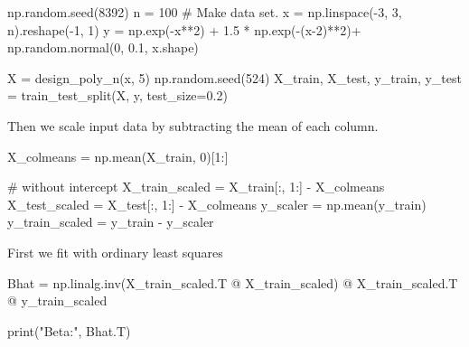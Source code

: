 \documentclass[
  letterpaper,
  DIV=11,
  numbers=noendperiod]{scrartcl}
\newenvironment{Shaded}{\begin{snugshade}}{\end{snugshade}}
\newcommand{\BuiltInTok}[1]{\textcolor[rgb]{0.00,0.23,0.31}{#1}}
\newcommand{\CommentTok}[1]{\textcolor[rgb]{0.37,0.37,0.37}{#1}}
\newcommand{\DecValTok}[1]{\textcolor[rgb]{0.68,0.00,0.00}{#1}}
\newcommand{\FloatTok}[1]{\textcolor[rgb]{0.68,0.00,0.00}{#1}}
\newcommand{\NormalTok}[1]{\textcolor[rgb]{0.00,0.23,0.31}{#1}}
\newcommand{\OperatorTok}[1]{\textcolor[rgb]{0.37,0.37,0.37}{#1}}
\newcommand{\StringTok}[1]{\textcolor[rgb]{0.13,0.47,0.30}{#1}}
\begin{document}
\begin{Shaded}
\begin{Highlighting}[]
\NormalTok{np.random.seed(}\DecValTok{8392}\NormalTok{)}
\NormalTok{n }\OperatorTok{=} \DecValTok{100}
\CommentTok{\# Make data set.}
\NormalTok{x }\OperatorTok{=}\NormalTok{ np.linspace(}\OperatorTok{{-}}\DecValTok{3}\NormalTok{, }\DecValTok{3}\NormalTok{, n).reshape(}\OperatorTok{{-}}\DecValTok{1}\NormalTok{, }\DecValTok{1}\NormalTok{)}
\NormalTok{y }\OperatorTok{=}\NormalTok{ np.exp(}\OperatorTok{{-}}\NormalTok{x}\OperatorTok{**}\DecValTok{2}\NormalTok{) }\OperatorTok{+} \FloatTok{1.5} \OperatorTok{*}\NormalTok{ np.exp(}\OperatorTok{{-}}\NormalTok{(x}\OperatorTok{{-}}\DecValTok{2}\NormalTok{)}\OperatorTok{**}\DecValTok{2}\NormalTok{)}\OperatorTok{+}\NormalTok{ np.random.normal(}\DecValTok{0}\NormalTok{, }\FloatTok{0.1}\NormalTok{, x.shape)}

\NormalTok{X }\OperatorTok{=}\NormalTok{ design\_poly\_n(x, }\DecValTok{5}\NormalTok{)}
\NormalTok{np.random.seed(}\DecValTok{524}\NormalTok{)}
\NormalTok{X\_train, X\_test, y\_train, y\_test }\OperatorTok{=}\NormalTok{ train\_test\_split(X, y, test\_size}\OperatorTok{=}\FloatTok{0.2}\NormalTok{)}
\end{Highlighting}
\end{Shaded}

Then we scale input data by subtracting the mean of each column.

\begin{Shaded}
\begin{Highlighting}[]
\NormalTok{X\_colmeans }\OperatorTok{=}\NormalTok{ np.mean(X\_train, }\DecValTok{0}\NormalTok{)[}\DecValTok{1}\NormalTok{:]}

\CommentTok{\# without intercept}
\NormalTok{X\_train\_scaled }\OperatorTok{=}\NormalTok{ X\_train[:, }\DecValTok{1}\NormalTok{:] }\OperatorTok{{-}}\NormalTok{ X\_colmeans}
\NormalTok{X\_test\_scaled }\OperatorTok{=}\NormalTok{ X\_test[:, }\DecValTok{1}\NormalTok{:] }\OperatorTok{{-}}\NormalTok{ X\_colmeans}
\NormalTok{y\_scaler }\OperatorTok{=}\NormalTok{ np.mean(y\_train)}
\NormalTok{y\_train\_scaled }\OperatorTok{=}\NormalTok{ y\_train }\OperatorTok{{-}}\NormalTok{ y\_scaler}
\end{Highlighting}
\end{Shaded}

First we fit with ordinary least squares

\begin{Shaded}
\begin{Highlighting}[]
\NormalTok{Bhat }\OperatorTok{=}\NormalTok{ np.linalg.inv(X\_train\_scaled.T }\OperatorTok{@}\NormalTok{ X\_train\_scaled) }\OperatorTok{@}\NormalTok{ X\_train\_scaled.T }\OperatorTok{@}\NormalTok{ y\_train\_scaled}

\BuiltInTok{print}\NormalTok{(}\StringTok{"Beta:"}\NormalTok{, Bhat.T)}
\end{Highlighting}
\end{Shaded}
\end{document}
